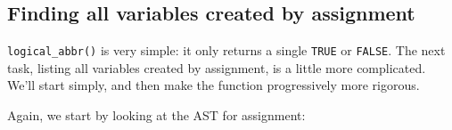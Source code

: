 \begin{Shaded}
\begin{Highlighting}[]
\StringTok{ }
    \StringTok{ }
  \StringTok{ }
      \NormalTok{(}\NormalTok{)}
    \NormalTok{\}}
    \NormalTok{(}\NormalTok{, }
       \NormalTok{)}
  \NormalTok{\}}
\NormalTok{\}}

\NormalTok{(}\NormalTok{(}\NormalTok{))}
\NormalTok{(}
\NormalTok{(}\NormalTok{(} 
\NormalTok{(} \NormalTok{))}
\end{Highlighting}
\end{Shaded}

\subsection{Finding all variables created by assignment}

\texttt{logical\_abbr()} is very simple: it only returns a single
\texttt{TRUE} or \texttt{FALSE}. The next task, listing all variables
created by assignment, is a little more complicated. We'll start simply,
and then make the function progressively more rigorous.

Again, we start by looking at the AST for assignment:

\begin{Shaded}
\begin{Highlighting}[]
\StringTok{ }\NormalTok{)}
\CommentTok{#> \textbackslash{}- ()}
\end{Highlighting}
\end{Shaded}

